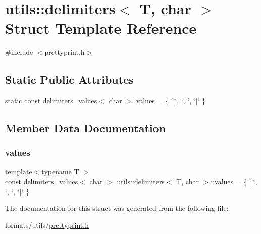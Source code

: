 \hypertarget{structutils_1_1delimiters_3_01_t_00_01char_01_4}{}\section{utils\+::delimiters$<$ T, char $>$ Struct Template Reference}
\label{structutils_1_1delimiters_3_01_t_00_01char_01_4}


{\ttfamily \#include $<$prettyprint.\+h$>$}

\subsection*{Static Public Attributes}
\begin{DoxyCompactItemize}
\item 
static const \mbox{\hyperlink{structutils_1_1delimiters__values}{delimiters\+\_\+values}}$<$ char $>$ \mbox{\hyperlink{structutils_1_1delimiters_3_01_t_00_01char_01_4_a640c7cf941286b19e708974eac2b4648}{values}} = \{ \char`\"{}\mbox{[}\char`\"{}, \char`\"{}, \char`\"{}, \char`\"{}\mbox{]}\char`\"{} \}
\end{DoxyCompactItemize}


\subsection{Member Data Documentation}
\mbox{\label{structutils_1_1delimiters_3_01_t_00_01char_01_4_a640c7cf941286b19e708974eac2b4648}} 
\subsubsection{\texorpdfstring{values}{values}}
{\footnotesize\ttfamily template$<$typename T $>$ \\
const \mbox{\hyperlink{structutils_1_1delimiters__values}{delimiters\+\_\+values}}$<$ char $>$ \mbox{\hyperlink{structutils_1_1delimiters}{utils\+::delimiters}}$<$ T, char $>$\+::values = \{ \char`\"{}\mbox{[}\char`\"{}, \char`\"{}, \char`\"{}, \char`\"{}\mbox{]}\char`\"{} \}\hspace{0.3cm}{\ttfamily [static]}}



The documentation for this struct was generated from the following file\+:\begin{DoxyCompactItemize}
\item 
formats/utils/\mbox{\hyperlink{prettyprint_8h}{prettyprint.\+h}}\end{DoxyCompactItemize}
